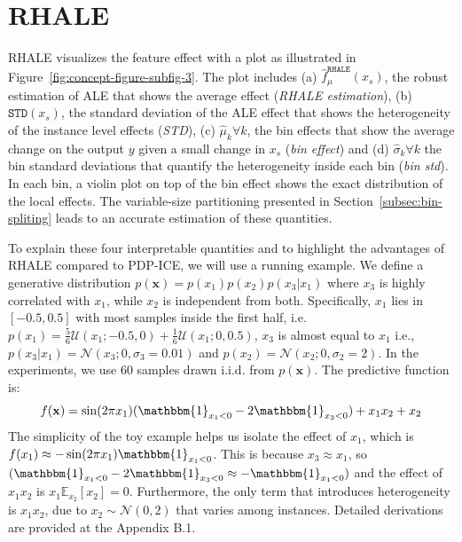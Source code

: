 \documentclass{ecai}  %
\newcommand{\xb}{\mathbf{x}}
\begin{document}
\section{RHALE}
\label{sec:UALE}

RHALE visualizes the feature effect with a plot as illustrated in
Figure~\ref{fig:concept-figure-subfig-3}. The plot includes
(a) $\hat{f}_{\mu}^{\mathtt{RHALE}}(x_s)$, the robust estimation of ALE that shows the average effect (\textit{RHALE estimation}),
(b) $\mathtt{STD}(x_s)$, the standard deviation of the ALE effect that shows the heterogeneity of the instance level effects (\textit{STD}),
(c) $\hat{\mu}_k \forall k$, the bin effects that show the average change on the output $y$ given a small change in \(x_s\) (\textit{bin effect}) and
(d) $\hat{\sigma}_k \forall k$ the bin standard deviations that quantify the heterogeneity inside each bin (\textit{bin std}).
In each bin, a violin plot on top of the bin effect shows the exact
distribution of the local effects. The variable-size
partitioning presented in Section~\ref{subsec:bin-spliting} leads to
an accurate estimation of these quantities.

To explain these four interpretable quantities and to highlight the
advantages of RHALE compared to PDP-ICE, we will use a running
example. We define a generative distribution
$p(\xb)= p(x_1)p(x_2)p(x_3|x_1)$ where $x_3$ is highly correlated with
$x_1$, while $x_2$ is independent from both.  Specifically, \(x_1\)
lies in \([-0.5, 0.5]\) with most samples inside the first half, i.e.
$p(x_1) = \frac{5}{6}\mathcal{U}(x_1;-0.5, 0) +
\frac{1}{6}\mathcal{U}(x_1;0, 0.5)$, \(x_3\) is almost equal to
\( x_1\) i.e., $p(x_3|x_1) = \mathcal{N}(x_3; 0, \sigma_3=0.01)$ and
$p(x_2) = \mathcal{N}(x_2; 0, \sigma_2=2)$. In the experiments, we use
60 samples drawn i.i.d. from \(p(\xb)\).  The predictive function is:
%
\begin{equation}
  \label{eq:target_function}
  f(\xb) = \sin(2 \pi x_1) (\mathbbm{1}_{x_1 < 0} - 2 \mathbbm{1}_{x_3 < 0}) + x_1 x_2 + x_2
\end{equation}
%
The simplicity of the toy example helps us isolate the effect of $x_1$,
which is $f(x_1) \approx -\sin(2 \pi x_1) \mathbbm{1}_{x_1<0}$.
This is because $x_3 \approx x_1$, so $(\mathbbm{1}_{x_1 < 0} - 2 \mathbbm{1}_{x_3 < 0} \approx - \mathbbm{1}_{x_1 < 0})$ and the effect of $x_1 x_2$ is $x_1 \mathbb{E}_{x_2} [x_2] = 0 $.
Furthermore, the only term that introduces heterogeneity is $x_1 x_2$,
due to $x_2 \sim \mathcal{N}(0, 2)$ that varies among instances.
Detailed derivations are provided at the Appendix B.1.
\end{document}
